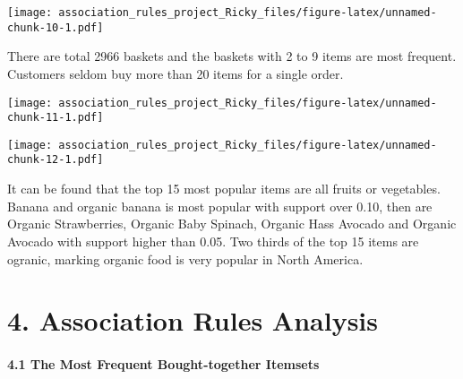 \documentclass[]{article}
\newenvironment{Shaded}{\begin{snugshade}}{\end{snugshade}}
\newcommand{\DataTypeTok}[1]{\textcolor[rgb]{0.13,0.29,0.53}{#1}}
\newcommand{\DecValTok}[1]{\textcolor[rgb]{0.00,0.00,0.81}{#1}}
\newcommand{\KeywordTok}[1]{\textcolor[rgb]{0.13,0.29,0.53}{\textbf{#1}}}
\newcommand{\NormalTok}[1]{#1}
\newcommand{\StringTok}[1]{\textcolor[rgb]{0.31,0.60,0.02}{#1}}
\let\oldparagraph\paragraph
\renewcommand{\paragraph}[1]{\oldparagraph{#1}\mbox{}}
\begin{document}
\texttt{[image: association\_rules\_project\_Ricky\_files/figure-latex/unnamed-chunk-10-1.pdf]}

There are total 2966 baskets and the baskets with 2 to 9 items are most
frequent. Customers seldom buy more than 20 items for a single order.

\begin{Shaded}
\end{Shaded}

\texttt{[image: association\_rules\_project\_Ricky\_files/figure-latex/unnamed-chunk-11-1.pdf]}

\begin{Shaded}
\end{Shaded}

\texttt{[image: association\_rules\_project\_Ricky\_files/figure-latex/unnamed-chunk-12-1.pdf]}

It can be found that the top 15 most popular items are all fruits or
vegetables. Banana and organic banana is most popular with support over
0.10, then are Organic Strawberries, Organic Baby Spinach, Organic Hass
Avocado and Organic Avocado with support higher than 0.05. Two thirds of
the top 15 items are ogranic, marking organic food is very popular in
North America.

\hypertarget{association-rules-analysis}{%
\section{4. Association Rules
Analysis}\label{association-rules-analysis}}

\hypertarget{the-most-frequent-bought-together-itemsets}{%
\paragraph{4.1 The Most Frequent Bought-together
Itemsets}\label{the-most-frequent-bought-together-itemsets}}
\end{document}
